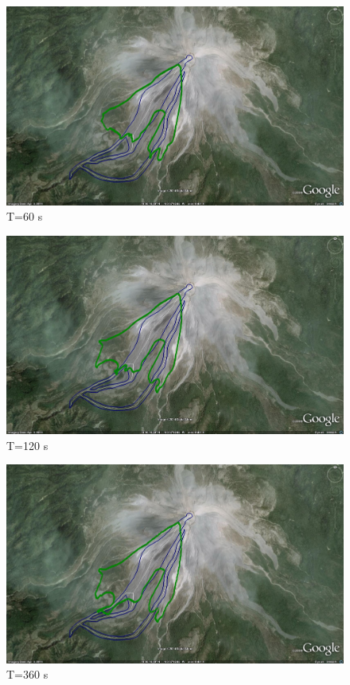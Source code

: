 \documentclass[letterpaper,10pt]{article}
\begin{document}
\begin{figure}[H]
\centerline{\includegraphics[width=.9\textwidth]{IMAGES/pics/phase6.jpg}}
\caption{T=60 s}
\label{yextent}
\end{figure}
\begin{figure}[H]
\centerline{\includegraphics[width=.9\textwidth]{IMAGES/pics/phase12.jpg}}
\caption{T=120 s}
\label{geoflow_interface}
\end{figure}
\begin{figure}[H]
\centerline{\includegraphics[width=.9\textwidth]{IMAGES/pics/phase36.jpg}}
\caption{T=360 s}
\label{geoflow_interface}
\end{figure}
\end{document}
